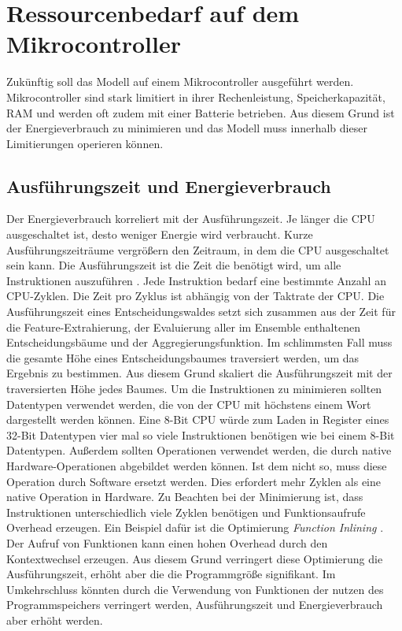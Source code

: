 \section{Ressourcenbedarf auf dem Mikrocontroller}
\label{sec:dt_resource_usage}
Zukünftig soll das Modell auf einem Mikrocontroller ausgeführt werden.
Mikrocontroller sind stark limitiert in ihrer Rechenleistung, Speicherkapazität, RAM und werden oft zudem mit einer Batterie betrieben.
Aus diesem Grund ist der Energieverbrauch zu minimieren und das Modell muss innerhalb dieser Limitierungen operieren können.

\newpage
\subsection{Ausführungszeit und Energieverbrauch}
\label{sub_sec:dt_ru_execution_time}
Der Energieverbrauch korreliert mit der Ausführungszeit.
Je länger die CPU ausgeschaltet ist, desto weniger Energie wird verbraucht.
Kurze Ausführungszeiträume vergrößern den Zeitraum, in dem die CPU ausgeschaltet sein kann.
Die Ausführungszeit ist die Zeit die benötigt wird, um alle Instruktionen auszuführen \cite{dymelThesis}.
Jede Instruktion bedarf eine bestimmte Anzahl an CPU-Zyklen.
Die Zeit pro Zyklus ist abhängig von der Taktrate der CPU.
\newline
\newline
Die Ausführungszeit eines Entscheidungswaldes setzt sich zusammen aus der Zeit für die Feature-Extrahierung, der Evaluierung aller im Ensemble enthaltenen Entscheidungsbäume
und der Aggregierungsfunktion.
Im schlimmsten Fall muss die gesamte Höhe eines Entscheidungsbaumes traversiert werden, um das Ergebnis zu bestimmen. Aus diesem Grund skaliert die Ausführungszeit mit der
traversierten Höhe jedes Baumes.
\newline
\newline
Um die Instruktionen zu minimieren sollten Datentypen verwendet werden, die von der CPU mit höchstens einem Wort dargestellt werden können.
Eine 8-Bit CPU würde zum Laden in Register eines 32-Bit Datentypen vier mal so viele Instruktionen benötigen wie bei einem 8-Bit Datentypen.
Außerdem sollten Operationen verwendet werden, die durch native Hardware-Operationen abgebildet werden können.
Ist dem nicht so, muss diese Operation durch Software ersetzt werden.
Dies erfordert mehr Zyklen als eine native Operation in Hardware.
\newline
\newline
Zu Beachten bei der Minimierung ist, dass Instruktionen unterschiedlich viele Zyklen benötigen und Funktionsaufrufe Overhead erzeugen.
Ein Beispiel dafür ist die Optimierung \textit{Function Inlining} \cite{leupers1999function}.
Der Aufruf von Funktionen kann einen hohen Overhead durch den Kontextwechsel erzeugen.
Aus diesem Grund verringert diese Optimierung die Ausführungszeit, erhöht aber die die Programmgröße signifikant.
Im Umkehrschluss könnten durch die Verwendung von Funktionen der nutzen des Programmspeichers verringert werden, Ausführungszeit und Energieverbrauch aber erhöht werden.

